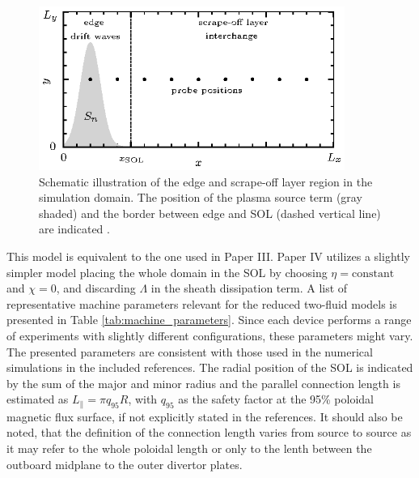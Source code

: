 \begin{figure}[t]
	\centering
	\includegraphics[width=10cm]{figures/model.eps}
	\caption{Schematic illustration of the edge and scrape-off layer region in the simulation domain. The position of the plasma
source term (gray shaded) and the border between edge and SOL (dashed vertical line) are indicated \cite{decristoforo2021numerical}.}
	\label{Fig:model}
\end{figure}

This model is equivalent to the one used in Paper III. Paper IV utilizes a slightly simpler model placing the whole domain in the SOL by choosing $\eta = \text{constant}$ and $\chi = 0$, and discarding $\Lambda$ in the sheath dissipation term. A list of representative machine parameters relevant for the reduced two-fluid models is presented in Table \ref{tab:machine_parameters}. Since each device performs a range of experiments with slightly different configurations, these parameters might vary. The presented parameters are consistent with those used in the numerical simulations in the included references. The radial position of the SOL is indicated by the sum of the major and minor radius and the parallel connection length is estimated as $L_\parallel = \pi q_{95} R$, with $q_{95}$ as the safety factor  at the 95\% poloidal magnetic flux surface, if not explicitly stated in the references. It should also be noted, that the definition of the connection length varies from source to source as it may refer to the whole poloidal length or only to the lenth between the outboard midplane to the outer divertor plates. 

